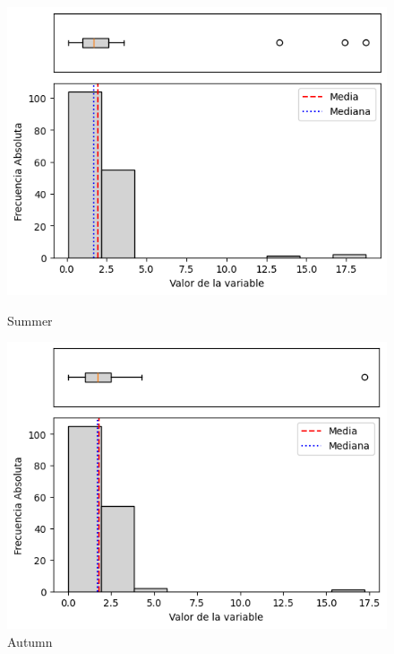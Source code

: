 \begin{figure}[htbp]
\centering
\begin{minipage}{0.30\textwidth}
  \includegraphics[width=\linewidth]{resultados/por_estacion_del_anio/boxplot_clases_por_estacion/Candavare/WS_HistBoxplot_Summer.png}
  \caption*{Summer}
\end{minipage}
\hfill
\begin{minipage}{0.30\textwidth}
  \includegraphics[width=\linewidth]{resultados/por_estacion_del_anio/boxplot_clases_por_estacion/Candavare/WS_HistBoxplot_Autumn.png}
  \caption*{Autumn}
\end{minipage}

\vspace{0.2cm}


\end{figure}
